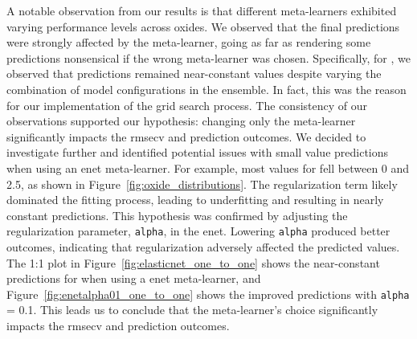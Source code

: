 A notable observation from our results is that different meta-learners exhibited varying performance levels across oxides.
We observed that the final predictions were strongly affected by the meta-learner, going as far as rendering some predictions nonsensical if the wrong meta-learner was chosen.
Specifically, for , we observed that predictions remained near-constant values despite varying the combination of model configurations in the  ensemble.
In fact, this was the reason for our implementation of the grid search process.
The consistency of our observations supported our hypothesis: changing only the meta-learner significantly impacts the \gls{rmsecv} and prediction outcomes.
We decided to investigate further and identified potential issues with small value predictions when using an \gls{enet} meta-learner.
For example, most values for  fell between 0 and 2.5, as shown in Figure~\ref{fig:oxide_distributions}.
The regularization term likely dominated the fitting process, leading to underfitting and resulting in nearly constant predictions.
This hypothesis was confirmed by adjusting the regularization parameter, \texttt{alpha}, in the \gls{enet}.
Lowering \texttt{alpha} produced better outcomes, indicating that regularization adversely affected the predicted values.
The 1:1 plot in Figure~\ref{fig:elasticnet_one_to_one} shows the near-constant predictions for  when using a \gls{enet} meta-learner, and Figure~\ref{fig:enetalpha01_one_to_one} shows the improved predictions with \texttt{alpha} = 0.1.
This leads us to conclude that the meta-learner's choice significantly impacts the \gls{rmsecv} and prediction outcomes.


